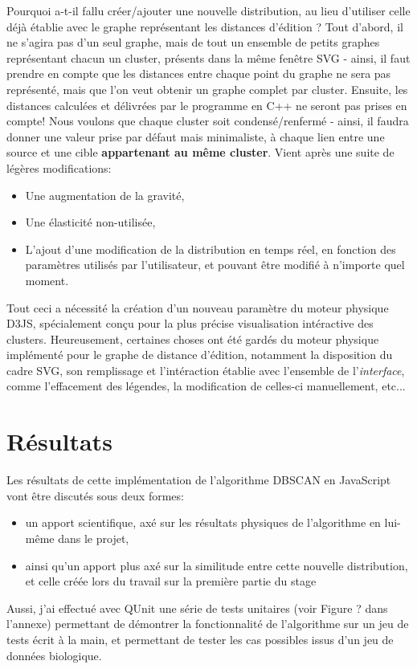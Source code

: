 \documentclass[12pt]{report}
\begin{document}
\begin{spacing}{1.2}
Pourquoi a-t-il fallu créer/ajouter une nouvelle distribution, au lieu d'utiliser celle déjà établie avec le graphe représentant les distances d'édition ?
\newline
Tout d'abord, il ne s'agira pas d'un seul graphe, mais de tout un ensemble de petits graphes représentant chacun un cluster, présents dans la même fenêtre SVG - ainsi, il faut prendre en compte que les distances entre chaque point du graphe ne sera pas représenté, mais que l'on veut obtenir un graphe complet par cluster.
\newline
Ensuite, les distances calculées et délivrées par le programme en C++ ne seront pas prises en compte! Nous voulons que chaque cluster soit condensé/renfermé - ainsi, il faudra donner une valeur prise par défaut mais minimaliste, à chaque lien entre une source et une cible \textbf{appartenant au même cluster}.
\newline
Vient après une suite de légères modifications:
	\begin{itemize}
	\item{Une augmentation de la gravité,}
	\item{Une élasticité non-utilisée,}
	\item{L'ajout d'une modification de la distribution en temps réel, en fonction des paramètres utilisés par l'utilisateur, et pouvant être modifié à n'importe quel moment.}
	\end{itemize}
Tout ceci a nécessité la création d'un nouveau paramètre du moteur physique D3JS, spécialement conçu pour la plus précise visualisation intéractive des clusters.
\newline
Heureusement, certaines choses ont été gardés du moteur physique implémenté pour le graphe de distance d'édition, notamment la disposition du cadre SVG, son remplissage et l'intéraction établie avec l'ensemble de l'\textit{interface}, comme l'effacement des légendes, la modification de celles-ci manuellement, etc...

\section{Résultats}

Les résultats de cette implémentation de l'algorithme DBSCAN en JavaScript vont être discutés sous deux formes:
	\begin{itemize}
	\item{un apport scientifique, axé sur les résultats physiques de l'algorithme en lui-même dans le projet,}
	\item{ainsi qu'un apport plus axé sur la similitude entre cette nouvelle distribution, et celle créée lors du travail sur la première partie du stage}
	\end{itemize}
Aussi, j'ai effectué avec QUnit une série de tests unitaires (voir Figure ? dans l'annexe) permettant de démontrer la fonctionnalité de l'algorithme sur un jeu de tests écrit à la main, et permettant de tester les cas possibles issus d'un jeu de données biologique.


\end{spacing}
\end{document}
